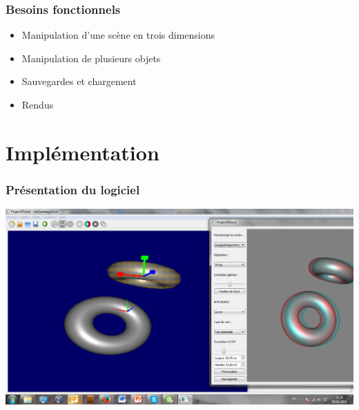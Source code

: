 \documentclass{beamer}
\begin{document}
\begin{frame}
\frametitle{Besoins fonctionnels}
\begin{itemize}[label=$\bullet$]
\item Manipulation d'une scène en trois dimensions
\item Manipulation de plusieurs objets
\item Sauvegardes et chargement
\item Rendus
\end{itemize}

\end{frame}


\section{Implémentation}

\begin{frame}
\frametitle{Présentation du logiciel}
\includegraphics[scale=0.22]{logiciel.png}

\end{frame}
\end{document}
